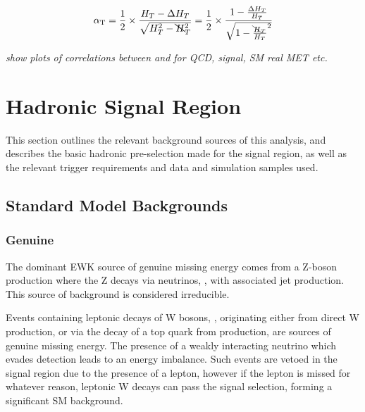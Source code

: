 \begin{equation}
\alpha_{\text{T}} = \frac{1}{2} \times \frac{H_T-\Delta H_T}{\sqrt{H_T^2 - \bcancel{H}_T^2}} = 
\frac{1}{2} \times \frac{1-\frac{\Delta H_T}{H_T}}{\sqrt{1 - \frac{\bcancel{H}_T}{H_T}^2}}
\label{eq:alphat_njet}
\end{equation}

\emph{show plots of correlations between \mht and \deltaHT for QCD, 
signal, SM real MET etc.}


\section{Hadronic Signal Region}
\label{sec:selection_hadronic}

This section outlines the relevant background sources of this analysis, and
describes the basic hadronic pre-selection made for the signal 
region, as well as the relevant trigger requirements and data and 
simulation samples used.

\subsection{Standard Model Backgrounds}

\subsubsection{Genuine \met}
The dominant EWK source of genuine missing energy comes from a Z-boson 
production where the Z decays
via neutrinos, \zinv, with associated jet production. This source of background
is considered irreducible.

Events containing leptonic decays of W bosons, \wlnu, originating either
from direct W production, or via the decay of a top quark from \ttbar 
production, are sources of genuine 
missing energy. The presence of a weakly interacting neutrino which evades
detection leads to an energy imbalance. Such events are vetoed in the signal
region due to the presence of a 
lepton, however if the lepton is missed for whatever reason, leptonic W decays 
can pass the signal selection, forming a significant SM background.


